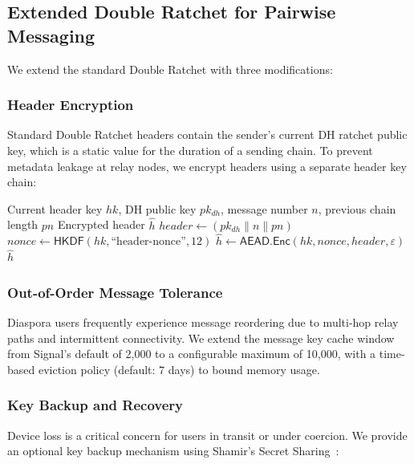 \documentclass[11pt,a4paper]{article}
\begin{document}
\subsection{Extended Double Ratchet for Pairwise Messaging}

We extend the standard Double Ratchet with three modifications:

\subsubsection{Header Encryption}

Standard Double Ratchet headers contain the sender's current DH ratchet public key, which is a static value for the duration of a sending chain. To prevent metadata leakage at relay nodes, we encrypt headers using a separate header key chain:

\begin{algorithm}[H]
\caption{Encrypted Header Construction}
\label{alg:header-encrypt}
\begin{algorithmic}[1]
\Require Current header key $hk$, DH public key $pk_{dh}$, message number $n$, previous chain length $pn$
\Ensure Encrypted header $\hat{h}$
\State $\mathit{header} \leftarrow (pk_{dh} \| n \| pn)$
\State $\mathit{nonce} \leftarrow \mathsf{HKDF}(hk, \text{``header-nonce''}, 12)$
\State $\hat{h} \leftarrow \mathsf{AEAD}.\mathsf{Enc}(hk, \mathit{nonce}, \mathit{header}, \varepsilon)$
\State \Return $\hat{h}$
\end{algorithmic}
\end{algorithm}

\subsubsection{Out-of-Order Message Tolerance}

Diaspora users frequently experience message reordering due to multi-hop relay paths and intermittent connectivity. We extend the message key cache window from Signal's default of 2{,}000 to a configurable maximum of 10{,}000, with a time-based eviction policy (default: 7 days) to bound memory usage.

\subsubsection{Key Backup and Recovery}

Device loss is a critical concern for users in transit or under coercion. We provide an optional key backup mechanism using Shamir's Secret Sharing~\citep{shamir1979share}:
\end{document}
